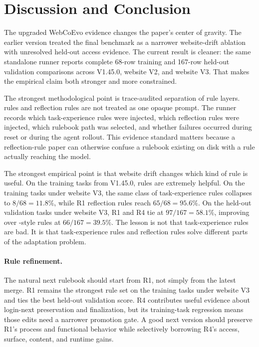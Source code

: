 \section{Discussion and Conclusion}

The upgraded WebCoEvo evidence changes the paper's center of gravity. The earlier version treated the final benchmark as a narrower website-drift ablation with unresolved held-out access evidence. The current result is cleaner: the same standalone runner reports complete 68-row training and 167-row held-out validation comparisons across \linkding{} V1.45.0, website V2, and website V3. That makes the empirical claim both stronger and more constrained.

The strongest methodological point is trace-audited separation of rule layers. \expel{} rules and reflection rules are not treated as one opaque prompt. The runner records which task-experience rules were injected, which reflection rules were injected, which rulebook path was selected, and whether failures occurred during reset or during the agent rollout. This evidence standard matters because a reflection-rule paper can otherwise confuse a rulebook existing on disk with a rule actually reaching the model.

The strongest empirical point is that website drift changes which kind of rule is useful. On the training tasks from \linkding{} V1.45.0, \expel{} rules are extremely helpful. On the training tasks under website V3, the same class of task-experience rules collapses to \(8/68=11.8\%\), while R1 reflection rules reach \(65/68=95.6\%\). On the held-out validation tasks under website V3, R1 and R4 tie at \(97/167=58.1\%\), improving over \expel{}-style rules at \(66/167=39.5\%\). The lesson is not that task-experience rules are bad. It is that task-experience rules and reflection rules solve different parts of the adaptation problem.

\paragraph{Rule refinement.}
The natural next rulebook should start from R1, not simply from the latest merge. R1 remains the strongest rule set on the training tasks under website V3 and ties the best held-out validation score. R4 contributes useful evidence about login-next preservation and finalization, but its training-task regression means those edits need a narrower promotion gate. A good next version should preserve R1's process and functional behavior while selectively borrowing R4's access, surface, content, and runtime gains.

